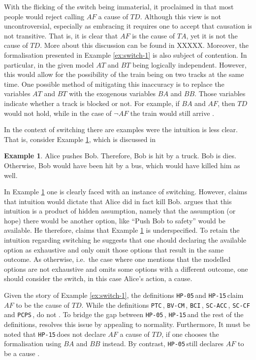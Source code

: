 \documentclass[11pt,a4paper]{book}
\theoremstyle{definition}
\theoremstyle{definition}
\newtheorem{example}{Example}[section]
\theoremstyle{definition}
\theoremstyle{remark}
\newcommand{\hpu}{\texttt{HP-05}\,}
\newcommand{\ptc}{\texttt{PTC}\,}
\newcommand{\hpm}{\texttt{HP-15}\,}
\newcommand{\bvcm}{\texttt{BV-CM}\,}
\newcommand{\bci}{\texttt{BCI}\,}
\newcommand{\scacc}{\texttt{SC-ACC}\,}
\newcommand{\pcps}{\texttt{PCPS}\,}
\newcommand{\sccf}{\texttt{SC-CF}\,}
\begin{document}
With the flicking of the switch being immaterial, it proclaimed in \parencite{beckers2018principled} that most people would reject calling $AF$ a cause of $TD$. 
Although this view is not uncontroversial, especially as embracing it requires one to accept that causation is not transitive. 
That is, it is clear that $AF$ is the cause of $TA$, yet it is not the cause of $TD$. More about this discussion can be found in XXXXX.
Moreover, the formalisation presented in Example \ref{ex:switch-1} is also subject of contention. In particular, in the given model $AT$ and $BT$ being logically independent. However, this would allow for the possibility 
of the train being on two tracks at the same time. One possible method of mitigating this inaccuracy is to replace the variables $AT$ and $BT$ with the exogenous variables $BA$ and $BB$.
Those variables indicate whether a track is blocked or not. For example, if $BA$ and $AF$, then $TD$ would not hold, while in the case of $\neg AF$ the train would still arrive \parencite{halpern2011actual}.

In the context of switching there are examples were the intuition is less clear. That is, consider Example \ref{ex:switch-2}, which is discussed in \parencite{weslake2015partial,bochman2018actual}

\begin{example}
\label{ex:switch-2}
Alice pushes Bob. Therefore, Bob is hit by a truck. Bob is dies.
Otherwise, Bob would have been hit by a bus, which would have killed him as well.
\end{example}

In Example \ref{ex:switch-2} one is clearly faced with an instance of switching. However, \parencite{mcdermott1995redundant} claims that intuition would dictate that Alice did in fact kill Bob.
\parencite{weslake2015partial} argues that this intuition is a product of hidden assumption, namely that the assumption (or hope) there would be another option, like ``Push Bob to safety'' would be available.
He therefore, claims that Example \ref{ex:switch-2} is underspecified.
To retain the intuition regarding switching he suggests that one should declaring the available option as exhaustive and only omit those options that result in the same outcome.
As otherwise, i.e.\ the case where one mentions that the modelled options are not exhaustive and omits some options with a different outcome, one should consider the switch, in this case Alice's action,  a cause.


Given the story of Example \ref{ex:switch-1}, the definitions \hpu and \hpm claim $AF$ to be the cause of $TD$.
While the definitions \ptc,  \bvcm,  \bci, \scacc, \sccf and \pcps, do not \parencite{beckers2018principled,bochman2018actual,denecker2018causal,weslake2015partial,halpern2015modification,batusov2018situation}.
To bridge the gap between  \hpu, \hpm and the rest of the definitions, \parencite{halpern2015modification} resolves this issue by appealing to normality.
Furthermore, It must be noted that \hpm does not declare $AF$ a cause of $TD$, if one chooses the formalisation using $BA$ and $BB$ instead.
By contrast, \hpu still declares $AF$ to be a cause \parencite{halpern2015modification}. 
\end{document}
